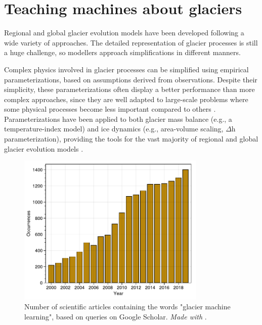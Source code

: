 \section{Teaching machines about glaciers}
\label{intro:ml}

Regional and global glacier evolution models have been developed following a wide variety of approaches. The detailed representation of glacier processes is still a huge challenge, so modellers approach simplifications in different manners. 

Complex physics involved in glacier processes can be simplified using empirical parameterizations, based on assumptions derived from observations. Despite their simplicity, these parameterizations often display a better performance than more complex approaches, since they are well adapted to large-scale problems where some physical processes become less important compared to others \citep{reveillet_relative_2018}. Parameterizations have been applied to both glacier mass balance (e.g., a temperature-index model) and ice dynamics (e.g., area-volume scaling, $\Delta$h parameterization), providing the tools for the vast majority of regional and global glacier evolution models \citep[e.g.,][]{marzeion_past_2012, huss_new_2015, maussion_open_2019, hock_glaciermip_2019}.

\begin{figure}[h]
\centering
\includegraphics[width=9cm]{Figures/intro/Figure_3.pdf}
\caption{Number of scientific articles containing the words "glacier machine learning", based on queries on Google Scholar. \textit{Made with} \citet{strobel_pold87academic-keyword-occurrence_2018}.}
\label{intro:fig3}
\end{figure} 

